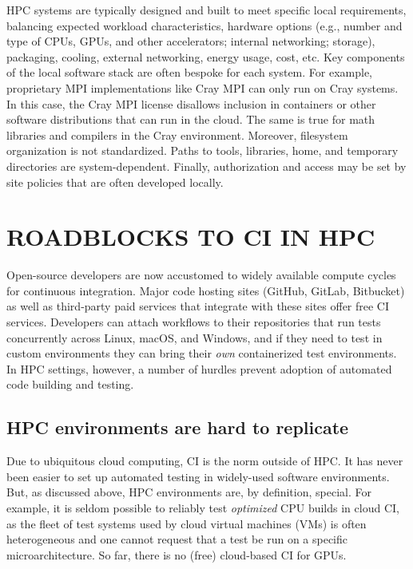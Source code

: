 \documentclass{IEEEcsmag}
\begin{document}
HPC systems are typically designed and built to meet specific local requirements, balancing
expected workload characteristics, hardware options (e.g., number and type of CPUs, GPUs,
and other accelerators; internal networking; storage), packaging, cooling, external networking,
energy usage, cost, etc.
Key components of the local software stack are often bespoke for each system.
For example, proprietary MPI implementations like Cray MPI can only run
on Cray systems. In this case, the Cray MPI license disallows inclusion in
containers or other software distributions that can run in the cloud. The same is true
for math libraries and compilers in the Cray environment. Moreover,
filesystem organization is not standardized.  Paths to tools, libraries, home, and
temporary directories are system-dependent.
Finally, authorization and access may be set by site policies that are often developed locally.



\section{ROADBLOCKS TO CI IN HPC}

Open-source developers are now accustomed to widely available compute cycles for
continuous integration. Major code hosting sites
(GitHub, GitLab, Bitbucket) as well as third-party paid services that integrate with
these sites offer free CI services. Developers can attach workflows to their repositories that run tests
concurrently across Linux, macOS, and Windows, and if they need to test in
custom environments they can bring their {\it own} containerized test environments.
In HPC settings, however, a number of hurdles prevent adoption of automated code building and testing.

\subsection{HPC environments are hard to replicate}

Due to ubiquitous cloud computing, CI is the norm outside of HPC. It has never been
easier to set up automated testing in widely-used software environments.
But, as discussed above, HPC environments are, by definition, special.
For example, it is seldom possible to reliably test {\it optimized} CPU builds in
cloud CI, as the fleet of test systems used by cloud virtual machines (VMs) is often heterogeneous and one
cannot request that a test be run on a specific microarchitecture. So far, there is no (free) cloud-based
CI for GPUs.
\end{document}
